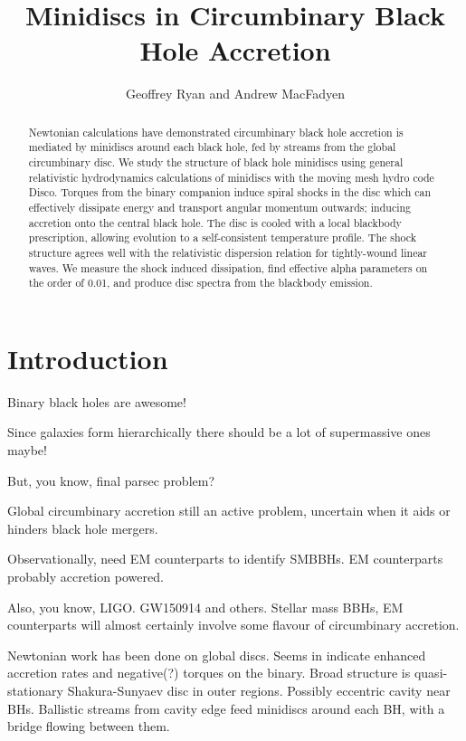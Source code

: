 \documentclass{emulateapj}
\begin{document}
\title{Minidiscs in Circumbinary Black Hole Accretion}
\author{Geoffrey Ryan and Andrew MacFadyen}

\begin{abstract}

Newtonian calculations have demonstrated circumbinary black hole accretion is mediated by minidiscs around each black hole, fed by streams from the global circumbinary disc. We study the structure of black hole minidiscs using general relativistic hydrodynamics calculations of minidiscs with the moving mesh hydro code Disco. Torques from the binary companion induce spiral shocks in the disc which can effectively dissipate energy and transport angular momentum outwards; inducing accretion onto the central black hole. The disc is cooled with a local blackbody prescription, allowing evolution to a self-consistent temperature profile.  The shock structure agrees well with the relativistic dispersion relation for tightly-wound linear waves. We measure the shock induced dissipation, find effective alpha parameters on the order of 0.01, and produce disc spectra from the blackbody emission.

\end{abstract}



\section{Introduction}
\label{sec:intro}

Binary black holes are awesome!  

Since galaxies form hierarchically there should be a lot of supermassive ones maybe!  

But, you know, final parsec problem?

Global circumbinary accretion still an active problem, uncertain when it aids
or hinders black hole mergers.

Observationally, need EM counterparts to identify SMBBHs.  EM counterparts 
probably accretion powered.

Also, you know, LIGO.  GW150914 and others.  Stellar mass BBHs, EM counterparts
will almost certainly involve some flavour of circumbinary accretion.

Newtonian work has been done on global discs.  Seems in indicate enhanced
accretion rates and negative(?) torques on the binary.  Broad structure is
quasi-stationary Shakura-Sunyaev disc in outer regions. Possibly eccentric
cavity near BHs. Ballistic streams from cavity edge feed minidiscs around each BH, with a bridge flowing between them.
\end{document}
